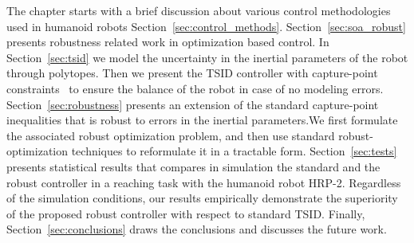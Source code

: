 The chapter starts with a brief discussion about various control methodologies used in humanoid robots Section~\ref{sec:control_methods}. Section~\ref{sec:soa_robust} presents robustness related work in optimization based control. In Section~\ref{sec:tsid} we model the uncertainty in the inertial parameters of the robot through polytopes. Then we present the TSID controller with capture-point constraints~\cite{Ramos2014a} to ensure the balance of the robot in case of no modeling errors. Section~\ref{sec:robustness} presents an extension of the standard capture-point inequalities that is robust to errors in the inertial parameters.We first formulate the associated robust optimization problem, and then use standard robust-optimization techniques to reformulate it in a tractable form. Section~\ref{sec:tests} presents statistical results that compares in simulation the standard and the robust controller in a reaching task with the humanoid robot HRP-2. Regardless of the simulation conditions, our results empirically demonstrate the superiority of the proposed robust controller with respect to standard TSID. Finally, Section~\ref{sec:conclusions} draws the conclusions and discusses the future work.

